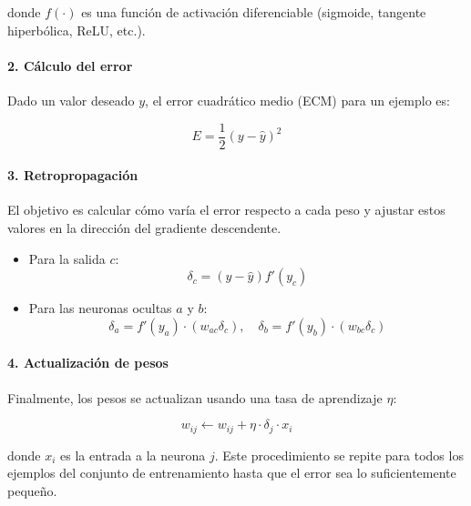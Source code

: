 donde $f(\cdot)$ es una función de activación diferenciable (sigmoide, tangente hiperbólica, ReLU, etc.).

\paragraph{2. Cálculo del error}
Dado un valor deseado $y$, el error cuadrático medio (ECM) para un ejemplo es:

\begin{equation}
    E = \frac{1}{2}(y - \hat{y})^2
\end{equation}

\paragraph{3. Retropropagación}
El objetivo es calcular cómo varía el error respecto a cada peso y ajustar estos valores en la dirección del gradiente descendente.

\begin{itemize}
    \item Para la salida $c$:
    \begin{equation}
        \delta_c = (y - \hat{y}) f'(y_{c})
    \end{equation}
    \item Para las neuronas ocultas $a$ y $b$:
    \begin{equation}
        \delta_a = f'(y_{a}) \cdot (w_{ac}\delta_c), \quad
        \delta_b = f'(y_{b}) \cdot (w_{bc}\delta_c)
    \end{equation}
\end{itemize}

\paragraph{4. Actualización de pesos}
Finalmente, los pesos se actualizan usando una tasa de aprendizaje $\eta$:

\begin{equation}
    w_{ij} \leftarrow w_{ij} + \eta \cdot \delta_j \cdot x_i
\end{equation}

donde $x_i$ es la entrada a la neurona $j$. Este procedimiento se repite para todos los ejemplos del conjunto de entrenamiento hasta que el error sea lo suficientemente pequeño.

